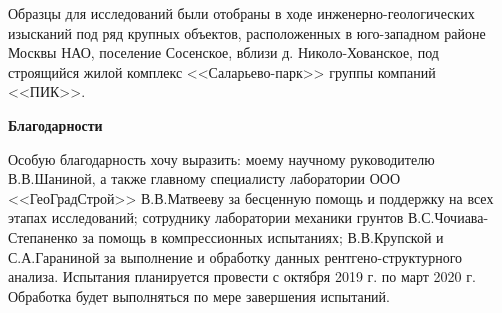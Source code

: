 
Образцы для исследований были отобраны в ходе инженерно-геологических изысканий под ряд крупных объектов, расположенных в юго-западном районе Москвы НАО, поселение Сосенское, вблизи д. Николо-Хованское, под строящийся жилой комплекс <<Саларьево-парк>> группы компаний <<ПИК>>. 
 

\textbf{Благодарности}

Особую благодарность хочу выразить: моему научному руководителю В.\;В.\;Шаниной, а также главному специалисту лаборатории ООО <<ГеоГрадСтрой>> В.\;В.\;Матвееву за бесценную помощь и поддержку на всех этапах исследований; сотруднику лаборатории механики грунтов В.\;С.\;Чочиава-Степаненко за помощь в компрессионных испытаниях; В.\;В.\;Крупской и С.\;А.\;Гараниной за выполнение и обработку данных рентгено-структурного анализа.
Испытания планируется провести с октября 2019 г. по март 2020 г. Обработка будет выполняться по мере завершения испытаний.